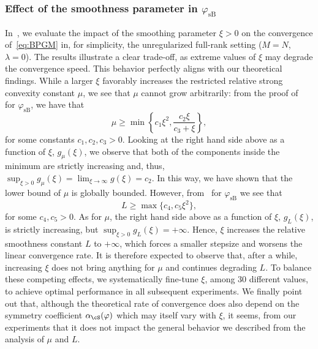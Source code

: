 \documentclass[11pt]{amsart}
\begin{document}
\subsubsection{\texorpdfstring{Effect of the smoothness parameter in $\varphi_{\mathrm{sB}}$}{Effect on the smoothing parameter in varphisB}}  In~, we evaluate the impact of the smoothing parameter $\xi>0$ on the convergence of~\cref{eq:BPGM} in, for simplicity, the unregularized full-rank setting ($M=N$, $\lambda=0$). The results illustrate a clear trade-off, as extreme values of $\xi$ may degrade the convergence speed. This behavior perfectly aligns with our theoretical findings. While a larger $\xi$ favorably increases the restricted relative strong convexity constant $\mu$, we see that $\mu$ cannot grow arbitrarily: from the proof of~ for $\varphi_{\mathrm{sB}}$, we have that
$$
\mu\geq \min\left\{c_1\xi^2, \frac{c_2\xi}{c_3+\xi}\right\},
$$
for some constants $c_1, c_2,c_3>0$. Looking at the right hand side above as a function of $\xi$, $g_\mu(\xi)$, we observe that both of the components inside the minimum are strictly increasing and, thus, $\sup_{\xi > 0} g_\mu(\xi) = \lim_{\xi \to \infty} g(\xi) = c_2$. In this way, we have shown that the lower bound of $\mu$ is globally bounded. However, from~ for $\varphi_{\mathrm{sB}}$ we see that
$$
L\geq \max\{c_4,c_5\xi^2\},
$$
for some $c_4, c_5>0$. As for $\mu$, the right hand side above as a function of $\xi$, $g_L(\xi)$, is strictly increasing, but $\sup_{\xi>0}g_L(\xi)=+\infty$. Hence, $\xi$ increases the relative smoothness constant $L$ to $+\infty$, which forces a smaller stepsize and worsens the linear convergence rate. It is therefore expected to observe that, after a while, increasing $\xi$ does not bring anything for $\mu$ and continues degrading $L$. To balance these competing effects, we systematically fine-tune $\xi$, among $30$ different values, to achieve optimal performance in all subsequent experiments. We finally point out that, although the theoretical rate of convergence does also depend on the symmetry coefficient $\alpha_\cS(\varphi)$ which may itself vary with $\xi$, it seems, from our experiments that it does not impact the general behavior we described from the analysis of $\mu$ and $L$.
\end{document}

